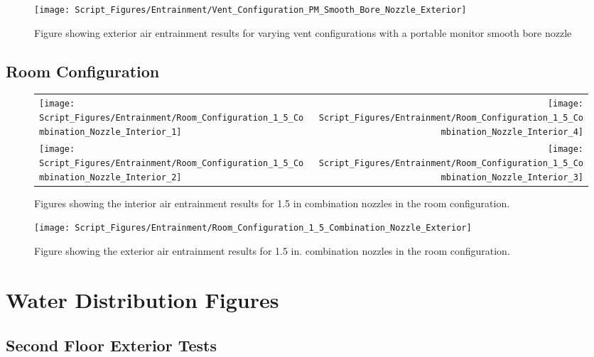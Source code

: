 \documentclass{article}
\begin{document}
\clearpage

\begin{figure}[!ht]
\centering
\texttt{[image: Script\_Figures/Entrainment/Vent\_Configuration\_PM\_Smooth\_Bore\_Nozzle\_Exterior]}
\caption{Figure showing exterior air entrainment results for varying vent configurations with a portable monitor smooth bore nozzle}
\label{fig:PM_Exterior_Smooth_Bore_Vent_Config}
\end{figure}

\clearpage

\subsection{Room Configuration}

\begin{figure}[!ht]
\begin{tabular*}{\textwidth}{lr}
\texttt{[image: Script\_Figures/Entrainment/Room\_Configuration\_1\_5\_Combination\_Nozzle\_Interior\_1]} &
\texttt{[image: Script\_Figures/Entrainment/Room\_Configuration\_1\_5\_Combination\_Nozzle\_Interior\_4]} \\
\texttt{[image: Script\_Figures/Entrainment/Room\_Configuration\_1\_5\_Combination\_Nozzle\_Interior\_2]} &
\texttt{[image: Script\_Figures/Entrainment/Room\_Configuration\_1\_5\_Combination\_Nozzle\_Interior\_3]} \\
\end{tabular*}
\caption{Figures showing the interior air entrainment results for 1.5 in combination nozzles in the room configuration.}
\label{fig:1_5_Interior_Combination_Room_Config}
\end{figure}

\clearpage

\begin{figure}[!ht]
\centering
\texttt{[image: Script\_Figures/Entrainment/Room\_Configuration\_1\_5\_Combination\_Nozzle\_Exterior]}
\caption{Figure showing the exterior air entrainment results for 1.5 in. combination nozzles in the room configuration.}
\label{fig:1_5_Exterior_Combination_Room_Config}
\end{figure}

\clearpage

\section{Water Distribution Figures}
\label{app:Water_Distribution_Figures}

\subsection{Second Floor Exterior Tests}
\end{document}
